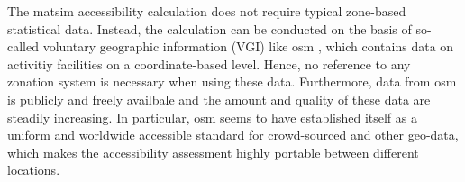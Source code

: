 The \gls{matsim} accessibility calculation does not require typical zone-based statistical data. Instead, the
calculation can be conducted on the basis of so-called voluntary geographic information (VGI) like \gls{osm}
, which contains data on activitiy facilities on a coordinate-based level. Hence, no reference to any zonation
system is necessary when using these data. Furthermore, data from \gls{osm} is publicly and freely availbale 
and the amount and quality of these data are steadily increasing. In particular, \gls{osm} seems to have 
established itself as a uniform and worldwide accessible standard for crowd-sourced and other geo-data, 
which makes the accessibility assessment highly portable between different locations.

%

